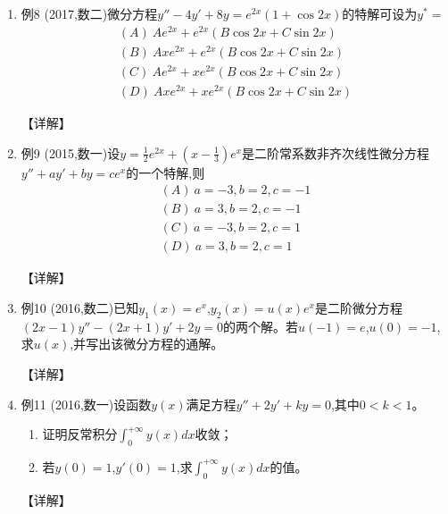 \documentclass[12pt, a4paper, oneside, UTF8]{ctexbook}
\begin{document}
\begin{enumerate}[label=\arabic*.,start=8]
    \item 例8 (2017,数二)微分方程$y''-4y'+8y=e^{2x}(1+\cos2x)$的特解可设为$y^*=$
    \begin{align*}
        (A)\ Ae^{2x}+e^{2x}(B\cos2x+C\sin2x) \\
        (B)\ Axe^{2x}+e^{2x}(B\cos2x+C\sin2x) \\
        (C)\ Ae^{2x}+xe^{2x}(B\cos2x+C\sin2x) \\
        (D)\ Axe^{2x}+xe^{2x}(B\cos2x+C\sin2x)
    \end{align*}
    
    \begin{solution}
    【详解】
    \end{solution}
    
    \item 例9 (2015,数一)设$y=\frac{1}{2}e^{2x}+(x-\frac{1}{3})e^x$是二阶常系数非齐次线性微分方程$y''+ay'+by=ce^x$的一个特解,则
    \begin{align*}
        (A)\ a=-3,b=2,c=-1 \\
        (B)\ a=3,b=2,c=-1 \\
        (C)\ a=-3,b=2,c=1 \\
        (D)\ a=3,b=2,c=1
    \end{align*}
    
    \begin{solution}
    【详解】
    \end{solution}
    
    \item 例10 (2016,数二)已知$y_1(x)=e^x$,$y_2(x)=u(x)e^x$是二阶微分方程$(2x-1)y''-(2x+1)y'+2y=0$的两个解。若$u(-1)=e$,$u(0)=-1$,求$u(x)$,并写出该微分方程的通解。
    
    \begin{solution}
    【详解】
    \end{solution}
    
    \item 例11 (2016,数一)设函数$y(x)$满足方程$y''+2y'+ky=0$,其中$0<k<1$。
    \begin{enumerate}[label=(\roman*)]
        \item 证明反常积分$\int_0^{+\infty}y(x)dx$收敛；
        \item 若$y(0)=1$,$y'(0)=1$,求$\int_0^{+\infty}y(x)dx$的值。
    \end{enumerate}
    
    \begin{solution}
    【详解】
    \end{solution}
\end{enumerate}
\end{document}
